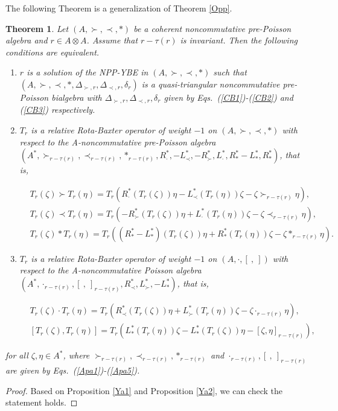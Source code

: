 \documentclass[12pt]{amsart}
\newtheorem{thm}{Theorem}[section]
\theoremstyle{definition}
\begin{document}
The following Theorem is a generalization of Theorem \ref{Opp}.
\begin{thm} \label{Aa}
Let $(A,\succ,\prec,\ast)$ be a coherent noncommutative pre-Poisson algebra and $r\in A\otimes A$. Assume that $r-\tau(r)$ is invariant.
Then the following
conditions are equivalent.
 \begin{enumerate}
\item $r$ is a solution of the NPP-YBE in $(A,\succ,\prec,\ast)$
 such that $(A,\succ,\prec,\ast,\Delta_{\succ,r},\Delta_{\prec,r},\delta_{r})$ is a quasi-triangular noncommutative pre-Poisson bialgebra
  with $\Delta_{\succ,r},\Delta_{\prec,r},\delta_{r}$ given by Eqs.~(\ref{CB1})-(\ref{CB2}) and (\ref{CB3}) respectively.
\item $T_r$ is a relative Rota-Baxter operator of weight $-1$ on  $(A,\succ,\prec,\ast)$
 with respect to the A-noncommutative pre-Poisson algebra 
 $(A^{*},\succ_{r-\tau(r)},\prec_{r-\tau(r)},\ast_{r-\tau(r)},R_{\cdot}^{*},-L_{\prec}^{*},-R_{\succ}^{*},
 L_{\cdot}^{*},R^{*}_{\ast}-L_{\ast}^{*},R^{*}_{\ast})$,
 that is,
 \begin{small}
 \begin{align}\label{AD5}&
T_{r}(\zeta)\succ T_{r}(\eta)=T_{r}(R_{\cdot}^{*}(T_{r}(\zeta))\eta-L_{\prec}^{*}(T_{r}(\eta))\zeta
-\zeta\succ_{r-\tau(r)}\eta),\\&
\label{AD6}T_{r}(\zeta)\prec T_{r}(\eta)=T_{r}(-R_{\succ}^{*}(T_{r}(\zeta))\eta+L_{\cdot}^{*}(T_{r}(\eta))\zeta
-\zeta\prec_{r-\tau(r)}\eta),
\\&\label{AD7}T_{r}(\zeta)\ast T_{r}(\eta)=T_{r}((R^{*}_{\ast}-L_{\ast}^{*})(T_{r}(\zeta))\eta
 +R_{\ast}^*(T_{r}(\eta))\zeta-\zeta\ast_{r-\tau(r)}\eta).
 \end{align}\end{small}
\item $T_r$ is a relative Rota-Baxter operator of weight $-1$ on $(A,\cdot, [ \ , \ ])$
 with respect to the A-noncommutative Poisson algebra $(A^{*},\cdot_{r-\tau(r)},[ \ , \ ]_{r-\tau(r)},R_{\prec}^{*}, L_{\succ}^{*},-L_{\ast}^{*})$, that is,
 \begin{small}
 \begin{align}\label{AD8} &
 T_{r}(\zeta)\cdot T_{r}(\eta)=T_{r}(R_{\prec}^{*}(T_{r}(\zeta))\eta+ L_{\succ}^{*}(T_{r}(\eta))\zeta-\zeta\cdot_{r-\tau(r)}\eta),\\&
 \label{AD9} [T_{r}(\zeta),T_{r}(\eta)]=T_{r}(L_{\ast}^{*}(T_{r}(\eta))\zeta-L_{\ast}^{*}(T_{r}(\zeta))\eta-[\zeta,\eta]_{r-\tau(r)}), 
 \end{align}\end{small}
  \end{enumerate}
for all $\zeta,\eta\in A^{*}$, where $\succ_{r-\tau(r)},\prec_{r-\tau(r)},\ast_{r-\tau(r)}$ and $\cdot_{r-\tau(r)},
[ \ , \ ]_{r-\tau(r)}$ are given by Eqs.~(\ref{Apa1})-(\ref{Apa5}).
\end{thm}
  \begin{proof}
  Based on Proposition \ref{Ya1} and Proposition \ref{Ya2}, we can check the statement holds.
  \end{proof}
\end{document}
